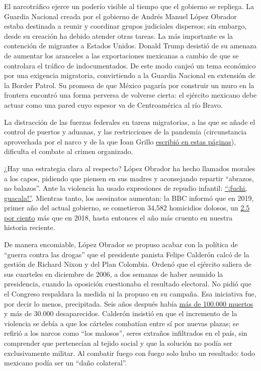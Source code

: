 El narcotráfico ejerce un poderío visible al tiempo que el gobierno se
repliega. La Guardia Nacional creada por el gobierno de Andrés Manuel
López Obrador estaba destinada a reunir y coordinar grupos judiciales
dispersos; sin embargo, desde su creación ha debido atender otras
tareas. La más importante es la contención de migrantes a Estados
Unidos. Donald Trump desistió de su amenaza de aumentar los aranceles a
las exportaciones mexicanas a cambio de que se controlara el tráfico de
indocumentados. De este modo canjeó un tema económico por una exigencia
migratoria, convirtiendo a la Guardia Nacional en extensión de la Border
Patrol. Su promesa de que México pagaría por construir un muro en la
frontera encontró una forma perversa de volverse cierta: el ejército
mexicano debe actuar como una pared cuyo espesor va de Centroamérica al
río Bravo.

La distracción de las fuerzas federales en tareas migratorias, a las que
se añade el control de puertos y aduanas, y las restricciones de la
pandemia (circunstancia aprovechada por el narco y de la que Ioan Grillo
\href{https://www.nytimes.com/es/2020/07/07/espanol/opinion/coronavirus-carteles-drogas-mexico.html}{escribió
en estas páginas}), dificulta el combate al crimen organizado.

¿Hay una estrategia clara al respecto? López Obrador ha hecho llamados
morales a los capos, pidiendo que piensen en sus madres y aconsejando
repartir ``abrazos, no balazos''. Ante la violencia ha usado expresiones
de repudio infantil:
\href{https://www.youtube.com/watch?v=5QzshrEKzzY}{``¡fuchi,
guacala!''}. Mientras tanto, los asesinatos aumentan: la BBC informó que
en 2019, primer año del actual gobierno, se cometieron 34,582 homicidios
dolosos, un
\href{https://www.bbc.com/mundo/noticias-america-latina-51186916}{2.5
por ciento} más que en 2018, hasta entonces el año más cruento en
nuestra historia reciente.

De manera encomiable, López Obrador se propuso acabar con la política de
``guerra contra las drogas'' que el presidente panista Felipe Calderón
calcó de la gestión de Richard Nixon y del Plan Colombia. Ordenó que el
ejército saliera de sus cuarteles en diciembre de 2006, a dos semanas de
haber asumido la presidencia, cuando la oposición cuestionaba el
resultado electoral. No pidió que el Congreso respaldara la medida ni la
propuso en su campaña. Esa iniciativa fue, por decir lo menos,
precipitada. Seis años después había
\href{https://www.infobae.com/america/mexico/2019/10/12/la-guerra-de-felipe-calderon-contra-el-narco-el-inicio-de-una-espiral-de-violencia-sin-fin/}{más
de 100.000 muertos} y más de 30.000 desaparecidos. Calderón insistió en
que el incremento de la violencia se debía a que los cárteles combatían
entre sí por nuevas plazas; se refirió a los narcos como ``los
malosos'', seres extraños infiltrados en el país, sin comprender que
pertenecían al tejido social y que la solución no podía ser
exclusivamente militar. Al combatir fuego con fuego solo hubo un
resultado: todo mexicano podía ser un ``daño colateral''.

